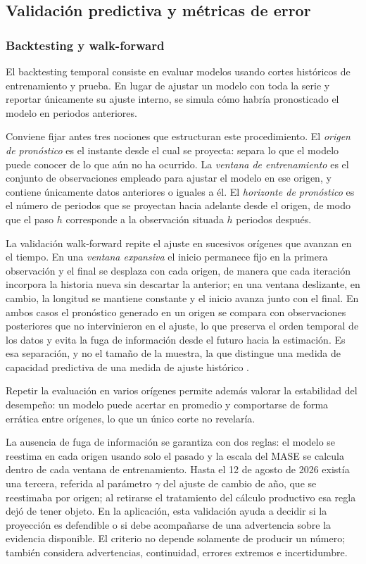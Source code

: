 \documentclass[12pt,letterpaper]{article}
\providecommand{\parencite}{\citep}
\begin{document}
\subsection{Validación predictiva y métricas de error}

\subsubsection{Backtesting y walk-forward}

El backtesting temporal consiste en evaluar modelos usando cortes históricos de entrenamiento y prueba. En lugar de ajustar un modelo con toda la serie y reportar únicamente su ajuste interno, se simula cómo habría pronosticado el modelo en periodos anteriores.

Conviene fijar antes tres nociones que estructuran este procedimiento. El \emph{origen de pronóstico} es el instante desde el cual se proyecta: separa lo que el modelo puede conocer de lo que aún no ha ocurrido. La \emph{ventana de entrenamiento} es el conjunto de observaciones empleado para ajustar el modelo en ese origen, y contiene únicamente datos anteriores o iguales a él. El \emph{horizonte de pronóstico} es el número de periodos que se proyectan hacia adelante desde el origen, de modo que el paso $h$ corresponde a la observación situada $h$ periodos después.

La validación walk-forward repite el ajuste en sucesivos orígenes que avanzan en el tiempo. En una \emph{ventana expansiva} el inicio permanece fijo en la primera observación y el final se desplaza con cada origen, de manera que cada iteración incorpora la historia nueva sin descartar la anterior; en una ventana deslizante, en cambio, la longitud se mantiene constante y el inicio avanza junto con el final. En ambos casos el pronóstico generado en un origen se compara con observaciones posteriores que no intervinieron en el ajuste, lo que preserva el orden temporal de los datos y evita la fuga de información desde el futuro hacia la estimación. Es esa separación, y no el tamaño de la muestra, la que distingue una medida de capacidad predictiva de una medida de ajuste histórico \parencite{tashman2000,hyndman_tscv_2021}.

Repetir la evaluación en varios orígenes permite además valorar la estabilidad del desempeño: un modelo puede acertar en promedio y comportarse de forma errática entre orígenes, lo que un único corte no revelaría.

La ausencia de fuga de información se garantiza con dos reglas: el modelo se reestima en cada origen usando solo el pasado y la escala del MASE se calcula dentro de cada ventana de entrenamiento. Hasta el 12 de agosto de 2026 existía una tercera, referida al parámetro \(\gamma\) del ajuste de cambio de año, que se reestimaba por origen; al retirarse el tratamiento del cálculo productivo esa regla dejó de tener objeto. En la aplicación, esta validación ayuda a decidir si la proyección es defendible o si debe acompañarse de una advertencia sobre la evidencia disponible. El criterio no depende solamente de producir un número; también considera advertencias, continuidad, errores extremos e incertidumbre.
\end{document}
